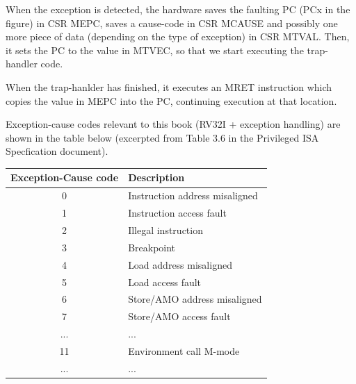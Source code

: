 When the exception is detected, the hardware saves the faulting PC
(PCx in the figure) in CSR MEPC, saves a cause-code in CSR MCAUSE and
possibly one more piece of data (depending on the type of exception)
in CSR MTVAL.  Then, it sets the PC to the value in MTVEC, so that we
start executing the trap-handler code.

When the trap-hanlder has finished, it executes an MRET instruction
which copies the value in MEPC into the PC, continuing execution at
that location.

Exception-cause codes relevant to this book (RV32I + exception
handling) are shown in the table below (excerpted from Table 3.6 in
the Privileged ISA Specfication document).

\begin{center}
 \begin{tabular}{|c|l|}
  \hline
  Exception-Cause code & Description \\
  \hline
  0 & Instruction address misaligned \\
  1 & Instruction access fault \\
  2 & Illegal instruction \\
  3 & Breakpoint \\
  4 & Load address misaligned \\
  5 & Load access fault \\
  6 & Store/AMO address misaligned \\
  7 & Store/AMO access fault \\
  ... & ... \\
  11 & Environment call M-mode \\
  ... & ... \\
  \hline
 \end{tabular}
\end{center}

